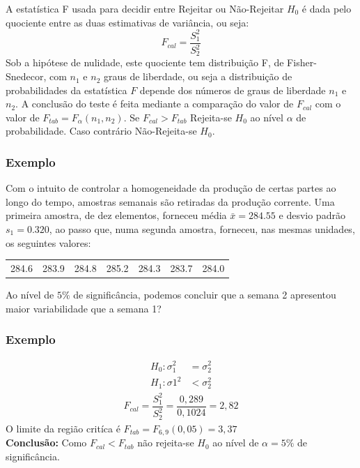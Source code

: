 \documentclass[14pt,aspectratio=1610]{beamer}
\newcommand{\bx}{\ensuremath{\bar{x}}}
\newcommand{\Ho}{\ensuremath{H_{0}}}
\begin{document}
\begin{frame}{}
\frametitle{}
\begin{block}{}
\justifying
A estatística F usada para decidir entre Rejeitar ou Não-Rejeitar $\Ho$ é dada pelo quociente entre as duas estimativas de variância, ou seja:
$$F_{cal}=\dfrac{S_{1}^{2}}{S_{2}^{2}}$$
Sob a hipótese de nulidade, este quociente tem distribuição F, de Fisher-Snedecor, com $n_{1}$ e $n_{2}$ graus de liberdade, ou seja a distribuição de probabilidades 
da estatística $F$ depende dos números de graus de liberdade $n_{1}$ e $n_{2}$. A conclusão do teste é feita mediante a comparação do valor de $F_{cal}$ com o 
valor de $F_{tab}=F_{\alpha}(n_{1},n_{2}).$ Se $F_{cal}>F_{tab}$ Rejeita-se $\Ho$ ao nível $\alpha$ de probabilidade. Caso contrário Não-Rejeita-se $\Ho.$
\end{block}
\end{frame}

\begin{frame}{}
\frametitle{Exemplo}
\begin{block}{}
\justifying
Com o intuito de controlar a homogeneidade da produção de certas partes ao longo do tempo, amostras semanais são retiradas da produção corrente. Uma primeira 
amostra, de dez elementos, forneceu média $\bx=284.55$ e desvio padrão $s_{1}=0.320$, ao passo que, numa segunda amostra, forneceu, nas mesmas unidades, os seguintes valores:
\begin{table}[]
\begin{tabular}{ccccccc}
             284.6 & 283.9 & 284.8 & 285.2 & 284.3 & 283.7 & 284.0\\ 
\end{tabular}
\end{table}
Ao nível de $5\%$ de significância, podemos concluir que a semana 2 apresentou maior variabilidade que a semana 1?
\end{block}
\end{frame}

\begin{frame}{}
\frametitle{Exemplo}
\begin{block}{}
\justifying
\begin{align*}
H_{0}: \sigma_{1}^{2}&=\sigma_{2}^{2} \\ 
H_{1}: \sigma{1}^{2}&<\sigma_{2}^{2}
\end{align*}
\begin{align}
F_{cal}=\dfrac{S_{1}^{2}}{S_{2}^{2}}=\dfrac{0,289}{0,1024}=2,82
\end{align}
O limite da região critíca é $F_{tab}=F_{6,9}(0,05)=3,37$\\
\textbf{Conclusão:} Como $F_{cal}<F_{tab}$ não rejeita-se $\Ho$ ao nível de $\alpha=5\%$ de significância. 
\end{block}
\end{frame}
\end{document}
